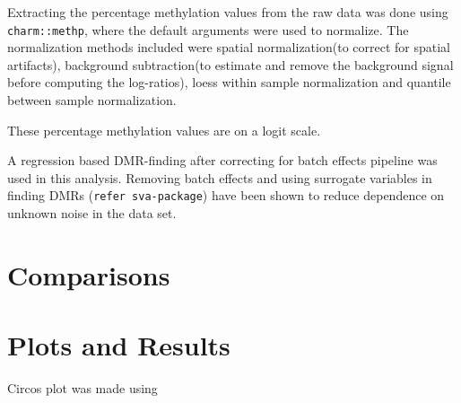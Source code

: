 \documentclass[11pt]{article}
\begin{document}
Extracting the percentage methylation values from the raw data was done using {\tt charm::methp}, where the default arguments were used to normalize. The normalization methods included were spatial normalization(to correct for spatial artifacts), background subtraction(to estimate and remove the background signal before computing the log-ratios), loess within sample normalization and quantile between sample normalization.

These percentage methylation values are on a logit scale.

A regression based DMR-finding after correcting for batch effects pipeline was used in this analysis. Removing batch effects and using surrogate variables in finding DMRs ({\tt refer sva-package}) have been shown to reduce dependence on unknown noise in the data set.



\section*{Comparisons}



\section*{Plots and Results}

Circos plot was made using 





% 
 
% 
%
% 
\end{document}
